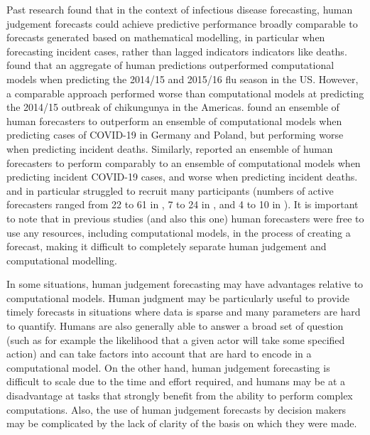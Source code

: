 \documentclass[10pt,a4paper,twocolumn]{article}
\begin{document}
Past research found that in the context of infectious disease forecasting, human judgement forecasts could achieve predictive performance broadly comparable to forecasts generated based on mathematical modelling, in particular when forecasting incident cases, rather than lagged indicators indicators like deaths. \citet{farrowHumanJudgmentApproach2017} found that an aggregate of human predictions outperformed computational models when predicting the 2014/15 and 2015/16 flu season in the US. However, a comparable approach performed worse than computational models at predicting the 2014/15 outbreak of chikungunya in the Americas. 
\citet{bosseComparingHumanModelbased2022} found an ensemble of human forecasters to outperform an ensemble of computational models when predicting cases of COVID-19 in Germany and Poland, but performing worse when predicting incident deaths. Similarly, \citet{mcandrewChimericForecastingCombining2022} reported an ensemble of human forecasters to perform comparably to an ensemble of computational models when predicting incident COVID-19 cases, and worse when predicting incident deaths. \citet{farrowHumanJudgmentApproach2017} and in particular \citet{bosseComparingHumanModelbased2022} struggled to recruit many participants (numbers of active forecasters ranged from 22 to 61 in \citet{mcandrewChimericForecastingCombining2022}, 7 to 24 in \citet{farrowHumanJudgmentApproach2017}, and 4 to 10 in \citet{bosseComparingHumanModelbased2022}). 
It is important to note that in previous studies (and also this one) human forecasters were free to use any resources, including computational models, in the process of creating a forecast, making it difficult to completely separate human judgement and computational modelling. 

In some situations, human judgement forecasting may have advantages relative to computational models. Human judgment may be particularly useful to provide timely forecasts in situations where data is sparse and many parameters are hard to quantify. Humans are also generally able to answer a broad set of question (such as for example the likelihood that a given actor will take some specified action) and can take factors into account that are hard to encode in a computational model. On the other hand, human judgement forecasting is difficult to scale due to the time and effort required, and humans may be at a disadvantage at tasks that strongly benefit from the ability to perform complex computations. Also, the use of human judgement forecasts by decision makers may be complicated by the lack of clarity of the basis on which they were made.
\end{document}
